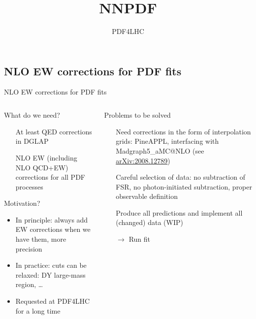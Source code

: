 \title{NNPDF}
\author[Christopher Schwan]{}
\date{PDF4LHC}

\subsection{NLO EW corrections for PDF fits}

\begin{frame}{NLO EW corrections for PDF fits}
\fontsize{9}{11}\selectfont
\begin{columns}[onlytextwidth]
\begin{column}{0.45\textwidth}

\begin{block}{What do we need?}
\begin{itemize}
\item[\ding{51}] At least QED corrections in DGLAP
\item[\ding{55}] NLO EW (including NLO QCD+EW) corrections for all PDF processes
\end{itemize}
\end{block}

\vspace*{0.5cm}

\begin{block}{Motivation?}
\begin{itemize}
\item In principle: always add EW corrections when we have them, more precision
\item In practice: cuts can be relaxed: DY large-mass region, \ldots
\item Requested at PDF4LHC for a long time
\end{itemize}
\end{block}
\end{column}
\begin{column}{0.45\textwidth}
\begin{block}{Problems to be solved}
\begin{itemize}
\item[\ding{51}] Need corrections in the form of \alert{interpolation grids}: PineAPPL, interfacing with Madgraph5\_aMC@NLO (see \href{https://arxiv.org/abs/2008.12789}{arXiv:2008.12789})
\item[\ding{51}] Careful selection of data: no subtraction of FSR, no photon-initiated subtraction, proper observable definition
\item[\ding{55}] Produce all predictions and implement all (changed) data (WIP)
\item[$\rightarrow$] Run fit
\end{itemize}
\end{block}
\end{column}
\end{columns}
\end{frame}

